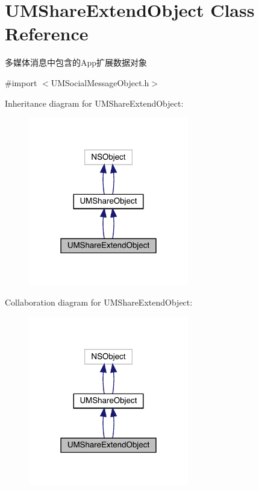 \hypertarget{interface_u_m_share_extend_object}{}\section{U\+M\+Share\+Extend\+Object Class Reference}
\label{interface_u_m_share_extend_object}


多媒体消息中包含的\+App扩展数据对象  




{\ttfamily \#import $<$U\+M\+Social\+Message\+Object.\+h$>$}



Inheritance diagram for U\+M\+Share\+Extend\+Object\+:\nopagebreak
\begin{figure}[H]
\begin{center}
\leavevmode
\includegraphics[width=198pt]{interface_u_m_share_extend_object__inherit__graph}
\end{center}
\end{figure}


Collaboration diagram for U\+M\+Share\+Extend\+Object\+:\nopagebreak
\begin{figure}[H]
\begin{center}
\leavevmode
\includegraphics[width=198pt]{interface_u_m_share_extend_object__coll__graph}
\end{center}
\end{figure}
